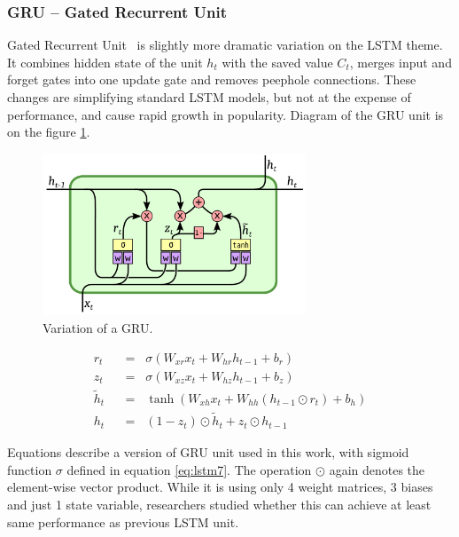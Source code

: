 		\subsubsection{GRU -- Gated Recurrent Unit}\label{subsubsec:gru}

Gated Recurrent Unit~\cite{DBLP:journals/corr/ChoMGBSB14} is slightly more dramatic variation on the LSTM theme. It combines hidden state of the unit $ h_t $ with the saved value $ C_t $, merges input and forget gates into one update gate and removes peephole connections. These changes are simplifying standard LSTM models, but not at the expense of performance, and cause rapid growth in popularity. Diagram of the GRU unit is on the figure \ref{fig:gru}.

\begin{figure}[!t]
	\centering
	\includegraphics[width=0.7\textwidth]{./fig/gru.pdf}
	\caption{Variation of a GRU.
		\label{fig:gru}}
\end{figure}

\begin{align}
r_t \hspace{7pt}&=\hspace{7pt} \sigma(W_{xr}x_t + W_{hr}h_{t-1} + b_r) \label{eq:gru1}\\
z_t \hspace{7pt}&=\hspace{7pt} \sigma(W_{xz}x_t + W_{hz}h_{t-1} + b_z) \label{eq:gru2}\\
\widetilde{h}_t \hspace{7pt}&=\hspace{7pt} \tanh(W_{xh}x_t + W_{hh}(h_{t-1}\odot r_t) + b_h) \label{eq:gru3}\\
h_t \hspace{7pt}&=\hspace{7pt} (1-z_t)\odot \widetilde{h}_t + z_t\odot h_{t-1} \label{eq:gru4}
\end{align}

Equations describe a version of GRU unit used in this work, with sigmoid function $ \sigma $ defined in equation \eqref{eq:lstm7}. The operation $ \odot $ again denotes the element-wise vector product. While it is using only 4 weight matrices, 3 biases and just 1 state variable, researchers studied whether this can achieve at least same performance as previous LSTM unit.


